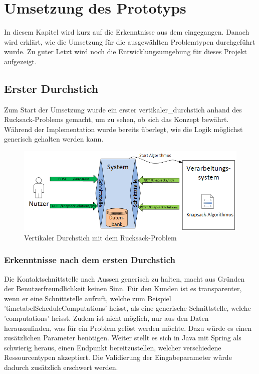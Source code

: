 %
%

\chapter{Umsetzung des Prototyps \resultAssignment{[R5]}}\label{chap.umsetzung}
In diesem Kapitel wird kurz auf die Erkenntnisse aus dem  eingegangen. Danach wird erklärt, wie die Umsetzung für die ausgewählten 
Problemtypen durchgeführt wurde. Zu guter Letzt wird noch die Entwicklungsumgebung für dieses Projekt aufgezeigt.

\section{Erster Durchstich}\label{entwicklungsumgebung}
Zum Start der Umsetzung wurde ein erster \gls{vertikaler_durchstich} anhand des Rucksack-Problems gemacht, um zu sehen, ob sich das Konzept bewährt. Während der 
Implementation wurde bereits überlegt, wie die Logik möglichst generisch gehalten werden kann.

\begin{figure}[h]
\centering
\includegraphics[scale=0.74]{images/visio/prototype_knapsack.png}
\caption[\Gls{vertikaler_durchstich} mit dem Rucksack-Problem]{Vertikaler Durchstich mit dem Rucksack-Problem \selfmade{}}
\label{fig:prototyp_knapsack}
\end{figure}

\subsection{Erkenntnisse nach dem ersten Durchstich}\label{learning_prototyp}
Die Kontaktschnittstelle nach Aussen generisch zu halten, macht aus Gründen der Benutzerfreundlichkeit keinen Sinn. Für den Kunden ist es transparenter, wenn er eine Schnittstelle aufruft, 
welche zum Beispiel 'timetabelScheduleComputations' heisst, als eine generische Schnittstelle, welche 'computations' heisst. Zudem ist nicht möglich, nur aus den Daten herauszufinden, was für 
ein Problem gelöst werden möchte. Dazu würde es einen zusätzlichen Parameter benötigen. Weiter stellt es sich in Java mit Spring als schwierig heraus, einen Endpunkt bereitzustellen, welcher 
verschiedene Ressourcentypen akzeptiert. Die Validierung der Eingabeparameter würde dadurch zusätzlich erschwert werden.

